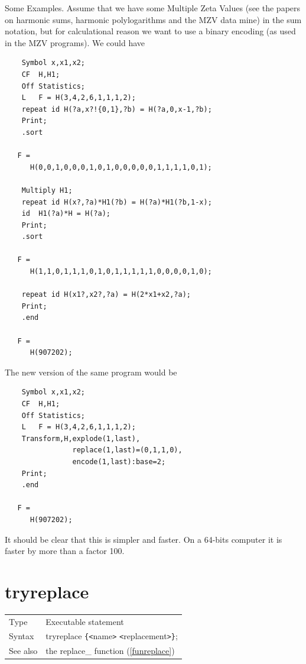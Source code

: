 Some Examples. Assume that we have some Multiple Zeta Values (see the papers on harmonic sums, harmonic polylogarithms and the MZV 
data mine) in the sum notation, but for calculational 
reason we want to use a binary encoding (as used in the MZV programs). We 
could have
\begin{verbatim}
    Symbol x,x1,x2;
    CF  H,H1;
    Off Statistics;
    L   F = H(3,4,2,6,1,1,1,2);
    repeat id H(?a,x?!{0,1},?b) = H(?a,0,x-1,?b);
    Print;
    .sort

   F =
      H(0,0,1,0,0,0,1,0,1,0,0,0,0,0,1,1,1,1,0,1);

    Multiply H1;
    repeat id H(x?,?a)*H1(?b) = H(?a)*H1(?b,1-x);
    id  H1(?a)*H = H(?a);
    Print;
    .sort

   F =
      H(1,1,0,1,1,1,0,1,0,1,1,1,1,1,0,0,0,0,1,0);

    repeat id H(x1?,x2?,?a) = H(2*x1+x2,?a);
    Print;
    .end

   F =
      H(907202);
\end{verbatim}
The new version of the same program would be
\begin{verbatim}
    Symbol x,x1,x2;
    CF  H,H1;
    Off Statistics;
    L   F = H(3,4,2,6,1,1,1,2);
    Transform,H,explode(1,last),
                replace(1,last)=(0,1,1,0),
                encode(1,last):base=2;
    Print;
    .end

   F =
      H(907202);
\end{verbatim}
It should be clear that this is simpler and faster. On a 64-bits computer 
it is faster by more than a factor 100.

\vspace{10mm}


\section{tryreplace}
\label{substatryreplace}

\noindent \begin{tabular}{ll}
Type & Executable statement\\
Syntax & tryreplace \verb:{:{\tt<}name{\tt>} {\tt<}replacement{\tt>}\verb:}:;
\\ See also & the replace\_ function (\ref{funreplace})
\end{tabular} \vspace{4mm}

